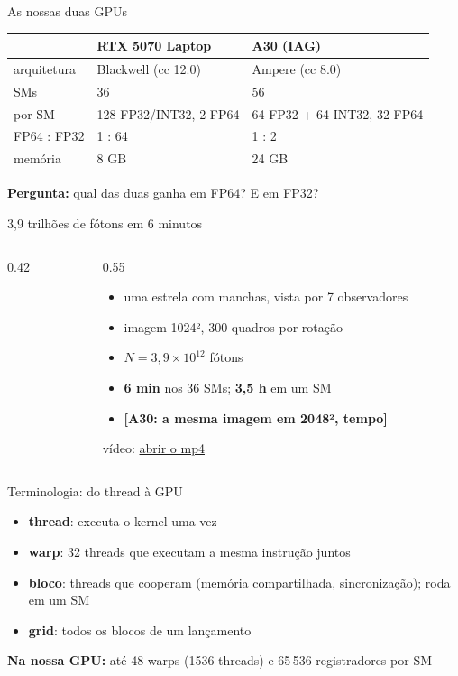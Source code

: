 \documentclass[aspectratio=169,11pt]{beamer}
\newcommand{\aaa}[1]{\textcolor{orange!90!black}{\textbf{[A30: #1]}}}
\begin{document}
\begin{frame}{As nossas duas GPUs}
  \centering
  \begin{tabular}{lll}
    \toprule
    & RTX 5070 Laptop & A30 (IAG) \\
    \midrule
    arquitetura & Blackwell (cc 12.0) & Ampere (cc 8.0) \\
    SMs & 36 & 56 \\
    por SM & 128 FP32/INT32, 2 FP64 & 64 FP32 + 64 INT32, 32 FP64 \\
    FP64 : FP32 & 1 : 64 & 1 : 2 \\
    memória & 8 GB & 24 GB \\
    \bottomrule
  \end{tabular}
  \vfill
  \textbf{Pergunta:} qual das duas ganha em FP64? E em FP32?
\end{frame}


\begin{frame}{3,9 trilhões de fótons em 6 minutos}
  \begin{columns}[c]
    \begin{column}{0.42\textwidth}
      \centering
    \end{column}
    \begin{column}{0.55\textwidth}
      \begin{itemize}
        \item uma estrela com manchas, vista por 7 observadores
        \item imagem 1024², 300 quadros por rotação
        \item $N = 3{,}9\times10^{12}$ fótons
        \item \textbf{6 min} nos 36 SMs; \textbf{3,5 h} em um SM
        \item \aaa{a mesma imagem em 2048², tempo}
      \end{itemize}
      \vfill
      \small vídeo: \href{run:../../EP4/runs/make/2026-11-22_20-07-02-1024-f300-gpu32-snr10/observers_around.mp4}{abrir o mp4}
    \end{column}
  \end{columns}
\end{frame}


\begin{frame}{Terminologia: do thread à GPU}
  \begin{itemize}
    \item \textbf{thread}: executa o kernel uma vez
    \item \textbf{warp}: 32 threads que executam a mesma instrução juntos
    \item \textbf{bloco}: threads que cooperam (memória compartilhada, sincronização); roda em um SM
    \item \textbf{grid}: todos os blocos de um lançamento
  \end{itemize}
  \vfill
  \textbf{Na nossa GPU:} até 48 warps (1536 threads) e 65\,536 registradores por SM
\end{frame}
\end{document}
